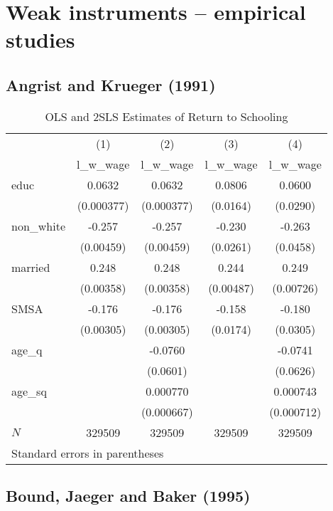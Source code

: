 \documentclass[12pt]{article}
\begin{document}
\newpage

\section{Weak instruments -- empirical studies}

\subsection{Angrist and Krueger (1991)}
\begin{table}[htpb!]
\centering
\caption{OLS and 2SLS Estimates of Return to Schooling}
\begin{tabular}{l*{4}{c}}
\hline
            &\multicolumn{1}{c}{(1)}&\multicolumn{1}{c}{(2)}&\multicolumn{1}{c}{(3)}&\multicolumn{1}{c}{(4)}\\
            &\multicolumn{1}{c}{l\_w\_wage}&\multicolumn{1}{c}{l\_w\_wage}&\multicolumn{1}{c}{l\_w\_wage}&\multicolumn{1}{c}{l\_w\_wage}\\
\hline
educ        &      0.0632&      0.0632&      0.0806&      0.0600\\
            &  (0.000377)&  (0.000377)&    (0.0164)&    (0.0290)\\
[1em]
non\_white   &      -0.257&      -0.257&      -0.230&      -0.263\\
            &   (0.00459)&   (0.00459)&    (0.0261)&    (0.0458)\\
[1em]
married     &       0.248&       0.248&       0.244&       0.249\\
            &   (0.00358)&   (0.00358)&   (0.00487)&   (0.00726)\\
[1em]
SMSA        &      -0.176&      -0.176&      -0.158&      -0.180\\
            &   (0.00305)&   (0.00305)&    (0.0174)&    (0.0305)\\
[1em]
age\_q       &            &     -0.0760&            &     -0.0741\\
            &            &    (0.0601)&            &    (0.0626)\\
[1em]
age\_sq      &            &    0.000770&            &    0.000743\\
            &            &  (0.000667)&            &  (0.000712)\\
\hline
\(N\)       &      329509&      329509&      329509&      329509\\
\hline
\multicolumn{5}{l}{\footnotesize Standard errors in parentheses}\\
\end{tabular}
\end{table}
\subsection{Bound, Jaeger and Baker (1995)}
\end{document}
